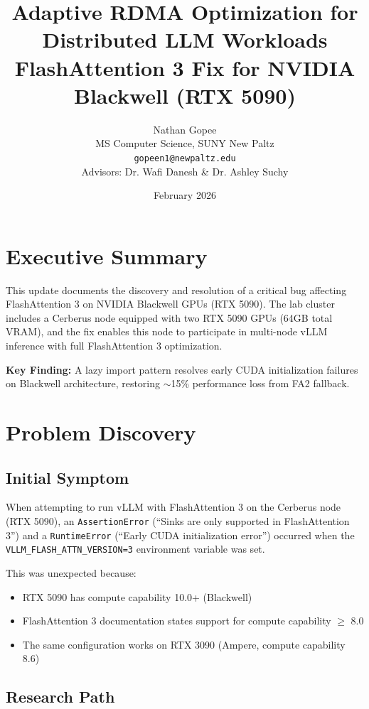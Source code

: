\documentclass[10pt,letterpaper]{article}
\title{\textbf{Adaptive RDMA Optimization for Distributed LLM Workloads}\\[0.5em]
\large FlashAttention 3 Fix for NVIDIA Blackwell (RTX 5090)}
\author{Nathan Gopee\\
MS Computer Science, SUNY New Paltz\\
\texttt{gopeen1@newpaltz.edu}\\[1em]
\small Advisors: Dr. Wafi Danesh \& Dr. Ashley Suchy}
\date{February 2026}
\begin{document}
\maketitle

\section{Executive Summary}

This update documents the discovery and resolution of a critical bug affecting FlashAttention 3 \cite{flashattn2} on NVIDIA Blackwell GPUs (RTX 5090). The lab cluster includes a Cerberus node equipped with two RTX 5090 GPUs (64GB total VRAM), and the fix enables this node to participate in multi-node vLLM inference with full FlashAttention 3 optimization.

\textbf{Key Finding:} A lazy import pattern resolves early CUDA initialization failures on Blackwell architecture, restoring $\sim$15\% performance loss from FA2 fallback.

\section{Problem Discovery}

\subsection{Initial Symptom}

When attempting to run vLLM with FlashAttention 3 on the Cerberus node (RTX 5090), an \texttt{AssertionError} (``Sinks are only supported in FlashAttention 3'') and a \texttt{RuntimeError} (``Early CUDA initialization error'') occurred when the \texttt{VLLM\_FLASH\_ATTN\_VERSION=3} environment variable was set.

This was unexpected because:
\begin{itemize}[noitemsep]
    \item RTX 5090 has compute capability 10.0+ (Blackwell)
    \item FlashAttention 3 documentation states support for compute capability $\geq$ 8.0
    \item The same configuration works on RTX 3090 (Ampere, compute capability 8.6)
\end{itemize}

\subsection{Research Path}
\end{document}

